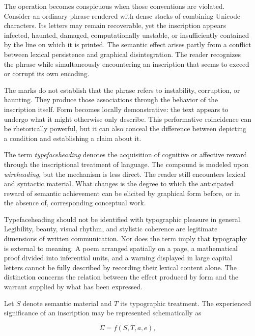 \documentclass[11pt]{article}
\newcommand{\term}[1]{\emph{#1}}
\begin{document}
The operation becomes conspicuous when those conventions are violated.
Consider an ordinary phrase rendered with dense stacks of combining Unicode
characters. Its letters may remain recoverable, yet the inscription appears
infected, haunted, damaged, computationally unstable, or insufficiently
contained by the line on which it is printed. The semantic effect arises
partly from a conflict between lexical persistence and graphical
disintegration. The reader recognizes the phrase while simultaneously
encountering an inscription that seems to exceed or corrupt its own encoding.

The marks do not establish that the phrase refers to instability, corruption,
or haunting. They produce those associations through the behavior of the
inscription itself. Form becomes locally demonstrative: the text appears to
undergo what it might otherwise only describe. This performative coincidence
can be rhetorically powerful, but it can also conceal the difference between
depicting a condition and establishing a claim about it.

The term \term{typefaceheading} denotes the acquisition of cognitive or
affective reward through the inscriptional treatment of language. The
compound is modeled upon \term{wireheading}, but the mechanism is less direct.
The reader still encounters lexical and syntactic material. What changes is
the degree to which the anticipated reward of semantic achievement can be
elicited by graphical form before, or in the absence of, corresponding
conceptual work.

Typefaceheading should not be identified with typographic pleasure in
general. Legibility, beauty, visual rhythm, and stylistic coherence are
legitimate dimensions of written communication. Nor does the term imply that
typography is external to meaning. A poem arranged spatially on a page, a
mathematical proof divided into inferential units, and a warning displayed in
large capital letters cannot be fully described by recording their lexical
content alone. The distinction concerns the relation between the effect
produced by form and the warrant supplied by what has been expressed.

Let \(S\) denote semantic material and \(T\) its typographic treatment. The
experienced significance of an inscription may be represented schematically
as

\begin{equation}
  \Sigma = f(S,T,a,e),
  \label{eq:typographic-significance}
\end{equation}
\end{document}
